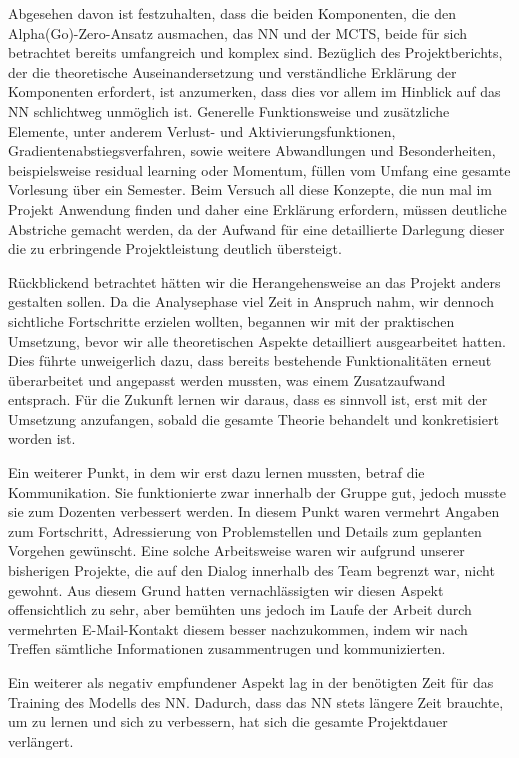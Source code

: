 \documentclass[12pt,a4paper]{article}
\begin{document}
Abgesehen davon ist festzuhalten, dass die beiden Komponenten, die den Alpha(Go)-Zero-Ansatz ausmachen, das NN und der MCTS, beide für sich betrachtet bereits umfangreich und komplex sind. Bezüglich des Projektberichts, der die theoretische Auseinandersetzung und verständliche Erklärung der Komponenten erfordert, ist anzumerken, dass dies vor allem im Hinblick auf das NN schlichtweg unmöglich ist. Generelle Funktionsweise und zusätzliche Elemente, unter anderem Verlust- und Aktivierungsfunktionen, Gradientenabstiegsverfahren, sowie weitere Abwandlungen und Besonderheiten, beispielsweise residual learning oder Momentum, füllen vom Umfang eine gesamte Vorlesung über ein Semester. Beim Versuch all diese Konzepte, die nun mal im Projekt Anwendung finden und daher eine Erklärung erfordern, müssen deutliche Abstriche gemacht werden, da der Aufwand für eine detaillierte Darlegung dieser die zu erbringende Projektleistung deutlich übersteigt.

Rückblickend betrachtet hätten wir die Herangehensweise an das Projekt anders gestalten sollen. Da die Analysephase viel Zeit in Anspruch nahm, wir dennoch sichtliche Fortschritte erzielen wollten, begannen wir mit der praktischen Umsetzung, bevor wir alle theoretischen Aspekte detailliert ausgearbeitet hatten. Dies führte unweigerlich dazu, dass bereits bestehende Funktionalitäten erneut überarbeitet und angepasst werden mussten, was einem Zusatzaufwand entsprach. Für die Zukunft lernen wir daraus, dass es sinnvoll ist, erst mit der Umsetzung anzufangen, sobald die gesamte Theorie behandelt und konkretisiert worden ist.

Ein weiterer Punkt, in dem wir erst dazu lernen mussten, betraf die Kommunikation. Sie funktionierte zwar innerhalb der Gruppe gut, jedoch musste sie zum Dozenten verbessert werden. In diesem Punkt waren vermehrt Angaben zum Fortschritt, Adressierung von Problemstellen und Details zum geplanten Vorgehen gewünscht. Eine solche Arbeitsweise waren wir aufgrund unserer bisherigen Projekte, die auf den Dialog innerhalb des Team begrenzt war, nicht gewohnt. Aus diesem Grund hatten vernachlässigten wir diesen Aspekt offensichtlich zu sehr, aber bemühten uns jedoch im Laufe der Arbeit durch vermehrten E-Mail-Kontakt diesem besser nachzukommen, indem wir nach Treffen sämtliche Informationen zusammentrugen und kommunizierten.

Ein weiterer als negativ empfundener Aspekt lag in der benötigten Zeit für das Training des Modells des NN. Dadurch, dass das NN stets längere Zeit brauchte, um zu lernen und sich zu verbessern, hat sich die gesamte Projektdauer verlängert.
\end{document}

